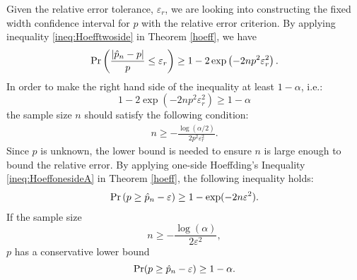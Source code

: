 \documentclass{iitthesis}
\theoremstyle{definition}
\begin{document}

Given the relative error tolerance, $\varepsilon_r$, we are looking into constructing the fixed width confidence interval for $p$ with the relative error criterion. By applying inequality \eqref{ineq:Hoefftwoside} in Theorem \ref{hoeff}, we have
\begin{align*}
\Pr\left(\frac{|\hat{p}_n-p|}{p} \leq \varepsilon_r\right) \geq 1-2\exp\left(-2np^2\varepsilon_r^2\right).
\end{align*}
In order to make the right hand side of the inequality at least $1-\alpha$, i.e.:
$$1-2\exp\left(-2np^2\varepsilon_r^2\right) \geq 1-\alpha$$
the sample size $n$ should satisfy the following condition: 
\begin{align*}
n \geq -\frac{\log (\alpha/2)}{2 p^2 \varepsilon_r^2}.
\end{align*}
Since $p$ is unknown, the lower bound is needed to ensure $n$ is large enough to bound the relative error. By applying one-side Hoeffding's Inequality \eqref{ineq:HoeffonesideA} in Theorem \ref{hoeff}, the following inequality holds:
\begin{align}\label{onesidehoeffn}
\Pr\left(p \geq \hat{p}_n-\varepsilon \right) \geq 1- \exp(-2n\varepsilon^2).
\end{align}
If the sample size 
$$n \geq -\frac{\log(\alpha)} {2\varepsilon^2 },$$
$p$ has a conservative lower bound $$\Pr(p \geq \hat{p}_n-\varepsilon)\geq1-\alpha.$$
\end{document}
